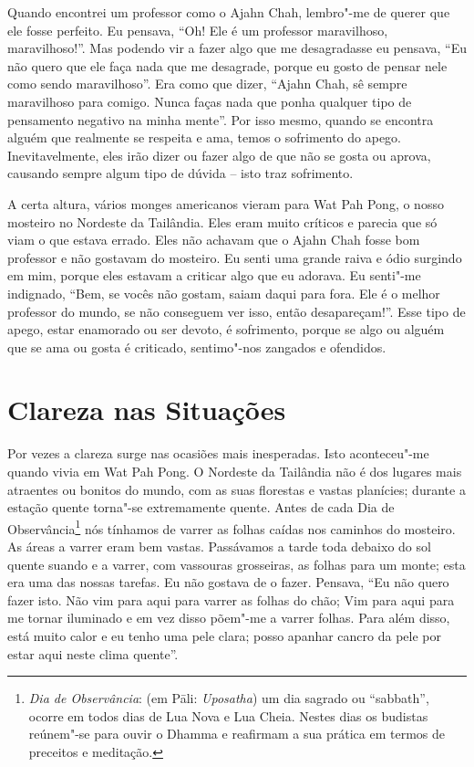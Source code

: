 Quando encontrei um professor como o Ajahn Chah, lembro"-me de querer que ele
fosse perfeito. Eu pensava, “Oh! Ele é um professor maravilhoso, maravilhoso!”.
Mas podendo vir a fazer algo que me desagradasse eu pensava, “Eu não quero que
ele faça nada que me desagrade, porque eu gosto de pensar nele como sendo
maravilhoso”. Era como que dizer, “Ajahn Chah, sê sempre maravilhoso para
comigo. Nunca faças nada que ponha qualquer tipo de pensamento negativo na minha
mente”. Por isso mesmo, quando se encontra alguém que realmente se respeita e
ama, temos o sofrimento do apego. Inevitavelmente, eles irão dizer ou fazer algo
de que não se gosta ou aprova, causando sempre algum tipo de dúvida – isto traz
sofrimento.

A certa altura, vários monges americanos vieram para Wat Pah Pong, o nosso
mosteiro no Nordeste da Tailândia. Eles eram muito críticos e parecia que só
viam o que estava errado. Eles não achavam que o Ajahn Chah fosse bom professor
e não gostavam do mosteiro. Eu senti uma grande raiva e ódio surgindo em mim,
porque eles estavam a criticar algo que eu adorava. Eu senti"-me indignado, “Bem,
se vocês não gostam, saiam daqui para fora. Ele é o melhor professor do mundo,
se não conseguem ver isso, então desapareçam!”. Esse tipo de apego, estar
enamorado ou ser devoto, é sofrimento, porque se algo ou alguém que se ama ou
gosta é criticado, sentimo"-nos zangados e ofendidos.

\section{Clareza nas Situações}

Por vezes a clareza surge nas ocasiões mais inesperadas. Isto aconteceu"-me
quando vivia em Wat Pah Pong. O Nordeste da Tailândia não é dos lugares mais
atraentes ou bonitos do mundo, com as suas florestas e vastas planícies; durante
a estação quente torna"-se extremamente quente. Antes de cada Dia de
Observância\footnote{%
  \emph{Dia de Observância}: (em Pāli: \emph{Uposatha}) um dia sagrado ou
  “sabbath”, ocorre em todos dias de Lua Nova e Lua Cheia. Nestes dias os
  budistas reúnem"-se para ouvir o Dhamma e reafirmam a sua prática em termos de
  preceitos e meditação.} nós tínhamos de varrer as folhas caídas nos caminhos
do mosteiro. As áreas a varrer eram bem vastas. Passávamos a tarde toda debaixo
do sol quente suando e a varrer, com vassouras grosseiras, as folhas para um
monte; esta era uma das nossas tarefas. Eu não gostava de o fazer. Pensava, “Eu
não quero fazer isto. Não vim para aqui para varrer as folhas do chão; Vim para
aqui para me tornar iluminado e em vez disso põem"-me a varrer folhas. Para além
disso, está muito calor e eu tenho uma pele clara; posso apanhar cancro da pele
por estar aqui neste clima quente”.

